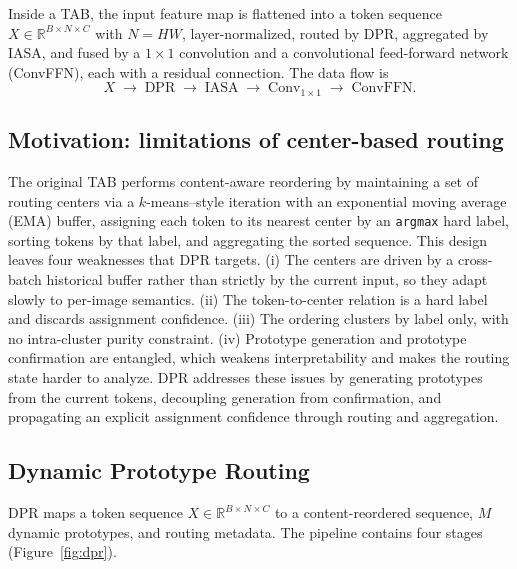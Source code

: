 Inside a TAB, the input feature map is flattened into a token sequence
$X\in\mathbb{R}^{B\times N\times C}$ with $N{=}HW$, layer-normalized, routed by DPR,
aggregated by IASA, and fused by a $1\times1$ convolution and a convolutional
feed-forward network (ConvFFN), each with a residual connection. The data flow is
\begin{equation}
X \;\to\; \mathrm{DPR} \;\to\; \mathrm{IASA} \;\to\; \mathrm{Conv}_{1\times1}
\;\to\; \mathrm{ConvFFN}.
\end{equation}

\subsection{Motivation: limitations of center-based routing}
\label{sec:method_motivation}
The original TAB performs content-aware reordering by maintaining a set of routing
centers via a $k$-means--style iteration with an exponential moving average (EMA)
buffer, assigning each token to its nearest center by an \texttt{argmax} hard
label, sorting tokens by that label, and aggregating the sorted sequence. This
design leaves four weaknesses that DPR targets. (i) The centers are driven by a
cross-batch historical buffer rather than strictly by the current input, so they
adapt slowly to per-image semantics. (ii) The token-to-center relation is a hard
label and discards assignment confidence. (iii) The ordering clusters by label
only, with no intra-cluster purity constraint. (iv) Prototype generation and
prototype confirmation are entangled, which weakens interpretability and makes the
routing state harder to analyze. DPR addresses these issues by generating prototypes
from the current tokens, decoupling generation from confirmation, and propagating an
explicit assignment confidence through routing and aggregation.

\subsection{Dynamic Prototype Routing}
\label{sec:method_dpr}
DPR maps a token sequence $X\in\mathbb{R}^{B\times N\times C}$ to a content-reordered
sequence, $M$ dynamic prototypes, and routing metadata. The pipeline contains four
stages (Figure~\ref{fig:dpr}).

